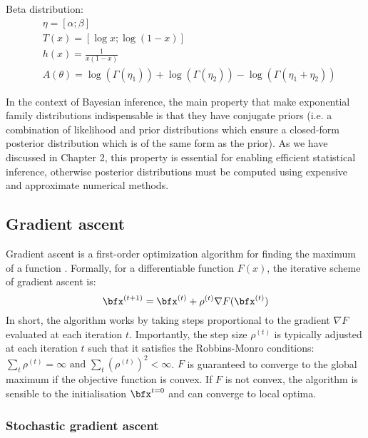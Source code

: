 Beta distribution:
\begin{align*}
	& \eta = [\alpha; \beta] \\
	& T(x) = [\log x; \log (1-x)] \\
	& h(x) = \frac{1}{x(1-x)} \\
	& A(\theta) = \log(\Gamma(\eta_1)) +\log(\Gamma(\eta_2)) - \log(\Gamma(\eta_1+\eta_2))
\end{align*}

In the context of Bayesian inference, the main property that make exponential family distributions indispensable is that they have conjugate priors (i.e. a combination of likelihood and prior distributions which ensure a closed-form posterior distribution which is of the same form as the prior). As we have discussed in Chapter 2, this property is essential for enabling efficient statistical inference, otherwise posterior distributions must be computed using expensive and approximate numerical methods.


\subsection{Gradient ascent} \label{section:gradient_ascent}

Gradient ascent is a first-order optimization algorithm for finding the maximum of a function \cite{Bishop2006,Murphy}. Formally, for a differentiable function $F(x)$, the iterative scheme of gradient ascent is:
\begin{equation} \label{gradient_ascent}
	\bfx^{(t+1)} = \bfx^{(t)} + \rho^{(t)} \nabla F(\bfx^{(t)})
\end{equation}
In short, the algorithm works by taking steps proportional to the gradient $\nabla F$ evaluated at each iteration $t$. 
Importantly, the step size $\rho^{(t)}$ is typically adjusted at each iteration $t$ such that it satisfies the Robbins-Monro conditions: $\sum_t \rho^{(t)} = \infty \text{ and } \sum_t (\rho^{(t)})^2 < \infty$. $F$ is guaranteed to converge to the global maximum \cite{Robbins-Monro1951} if the objective function is convex. If $F$ is not convex, the algorithm is sensible to the initialisation $\bfx^{t=0}$ and can converge to local optima.


\subsubsection{Stochastic gradient ascent} \label{section:stochastic_gradient_ascent}

